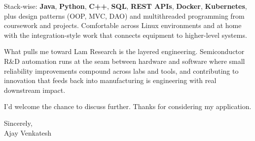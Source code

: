 \documentclass[letterpaper,11pt]{article}
\begin{document}
Stack-wise: \textbf{Java}, \textbf{Python}, \textbf{C++}, \textbf{SQL}, \textbf{REST APIs}, \textbf{Docker}, \textbf{Kubernetes}, plus design patterns (OOP, MVC, DAO) and multithreaded programming from coursework and projects. Comfortable across Linux environments and at home with the integration-style work that connects equipment to higher-level systems.

What pulls me toward Lam Research is the layered engineering. Semiconductor R\&D automation runs at the seam between hardware and software where small reliability improvements compound across labs and tools, and contributing to innovation that feeds back into manufacturing is engineering with real downstream impact.

I'd welcome the chance to discuss further. Thanks for considering my application.

\vspace{12pt}
Sincerely, \\
Ajay Venkatesh
\end{document}
